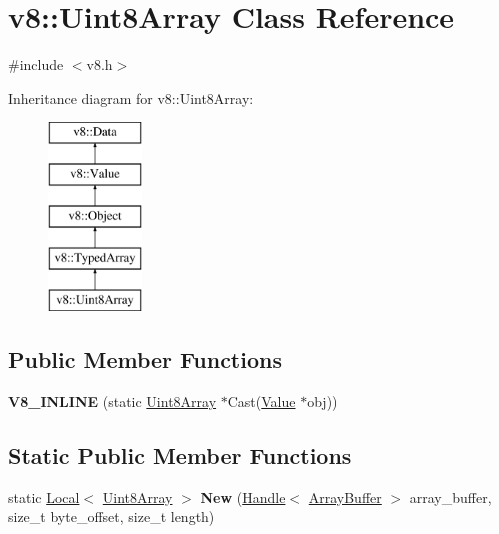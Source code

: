 \hypertarget{classv8_1_1_uint8_array}{}\section{v8\+:\+:Uint8\+Array Class Reference}
\label{classv8_1_1_uint8_array}


{\ttfamily \#include $<$v8.\+h$>$}

Inheritance diagram for v8\+:\+:Uint8\+Array\+:\begin{figure}[H]
\begin{center}
\leavevmode
\includegraphics[height=5.000000cm]{classv8_1_1_uint8_array}
\end{center}
\end{figure}
\subsection*{Public Member Functions}
\begin{DoxyCompactItemize}
\item 
\hypertarget{classv8_1_1_uint8_array_a3a934d777e7867aee673813c36659950}{}{\bfseries V8\+\_\+\+I\+N\+L\+I\+N\+E} (static \hyperlink{classv8_1_1_uint8_array}{Uint8\+Array} $\ast$Cast(\hyperlink{classv8_1_1_value}{Value} $\ast$obj))\label{classv8_1_1_uint8_array_a3a934d777e7867aee673813c36659950}

\end{DoxyCompactItemize}
\subsection*{Static Public Member Functions}
\begin{DoxyCompactItemize}
\item 
\hypertarget{classv8_1_1_uint8_array_a6033f331f7d059456bf871d3a8e8da44}{}static \hyperlink{classv8_1_1_local}{Local}$<$ \hyperlink{classv8_1_1_uint8_array}{Uint8\+Array} $>$ {\bfseries New} (\hyperlink{classv8_1_1_handle}{Handle}$<$ \hyperlink{classv8_1_1_array_buffer}{Array\+Buffer} $>$ array\+\_\+buffer, size\+\_\+t byte\+\_\+offset, size\+\_\+t length)\label{classv8_1_1_uint8_array_a6033f331f7d059456bf871d3a8e8da44}

\end{DoxyCompactItemize}


